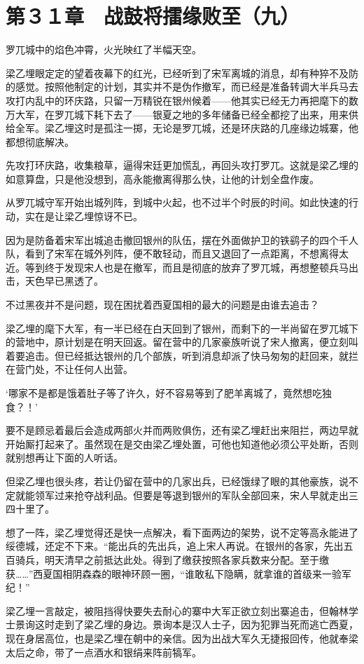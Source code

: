 \section{第３１章　战鼓将擂缘败至（九）}

罗兀城中的焰色冲霄，火光映红了半幅天空。

梁乙埋眼定定的望着夜幕下的红光，已经听到了宋军离城的消息，却有种猝不及防的感觉。按照他制定的计划，其实并不是伪作撤军，而已经是准备转调大半兵马去攻打内乱中的环庆路，只留一万精锐在银州候着——他其实已经无力再把麾下的数万大军，在罗兀城下耗下去了——银夏之地的多年储备已经全都挖了出来，用来供给全军。梁乙埋这时是孤注一掷，无论是罗兀城，还是环庆路的几座缘边城寨，他都想彻底解决。

先攻打环庆路，收集粮草，逼得宋廷更加慌乱，再回头攻打罗兀。这就是梁乙埋的如意算盘，只是他没想到，高永能撤离得那么快，让他的计划全盘作废。

从罗兀城守军开始出城列阵，到城中火起，也不过半个时辰的时间。如此快速的行动，实在是让梁乙埋惊讶不已。

因为是防备着宋军出城追击撤回银州的队伍，摆在外面做护卫的铁鹞子的四个千人队，看到了宋军在城外列阵，便不敢轻动，而且又退回了一点距离，不想离得太近。等到终于发现宋人也是在撤军，而且是彻底的放弃了罗兀城，再想整顿兵马出击，天色早已黑透了。

不过黑夜并不是问题，现在困扰着西夏国相的最大的问题是由谁去追击？

梁乙埋的麾下大军，有一半已经在白天回到了银州，而剩下的一半尚留在罗兀城下的营地中，原计划是在明天回返。留在营中的几家豪族听说了宋人撤离，便立刻叫着要追击。但已经抵达银州的几个部族，听到消息却派了快马匆匆的赶回来，就拦在营门处，不让任何人出营。

‘哪家不是都是饿着肚子等了许久，好不容易等到了肥羊离城了，竟然想吃独食？！’

要不是顾忌着最后会造成两部火并而两败俱伤，还有梁乙埋赶出来阻拦，两边早就开始厮打起来了。虽然现在是交由梁乙埋处置，可他也知道他必须公平处断，否则就别想再让下面的人听话。

但梁乙埋也很头疼，若让仍留在营中的几家出兵，已经饿绿了眼的其他豪族，说不定就能领军过来抢夺战利品。但要是等退到银州的军队全部回来，宋人早就走出三四十里了。

想了一阵，梁乙埋觉得还是快一点解决，看下面两边的架势，说不定等高永能进了绥德城，还定不下来。“能出兵的先出兵，追上宋人再说。在银州的各家，先出五百骑兵，明天清早之前抵达此处。得到了缴获按照各家兵数来分配。至于缴获……”西夏国相阴森森的眼神环顾一圈，“谁敢私下隐瞒，就拿谁的首级来一验军纪！”

梁乙埋一言敲定，被阻挡得快要失去耐心的寨中大军正欲立刻出寨追击，但翰林学士景询这时走到了梁乙埋的身边。景询本是汉人士子，因为犯罪当死而逃亡西夏，现在身居高位，也是梁乙埋在朝中的亲信。因为出战大军久无捷报回传，他就奉梁太后之命，带了一点酒水和银绢来阵前犒军。


